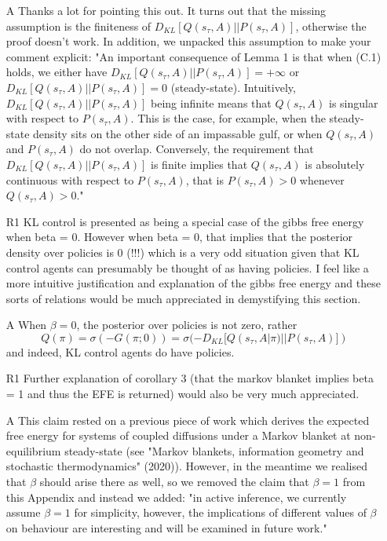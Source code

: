 \documentclass{article}
\begin{document}
\begin{itemize}
\item[A] Thanks a lot for pointing this out. It turns out that the missing assumption is the finiteness of $D_{KL}[Q(s_\tau, A) ||P(s_\tau, A)]$, otherwise the proof doesn't work. In addition, we unpacked this assumption to make your comment explicit: "An important consequence of Lemma 1 is that when (C.1) holds, we either have $D_{KL}[Q(s_\tau, A) ||P(s_\tau, A)]=+\infty$ or $D_{KL}[Q(s_\tau, A) ||P(s_\tau, A)]=0$ (steady-state). Intuitively, $D_{KL}[Q(s_\tau, A) ||P(s_\tau, A)]$ being infinite means that $Q(s_\tau, A)$ is singular with respect to $P(s_\tau, A)$. This is the case, for example, when the steady-state density sits on the other side of an impassable gulf, or when $Q(s_\tau, A)$ and $P(s_\tau, A)$ do not overlap. Conversely, the requirement that $D_{KL}[Q(s_\tau, A) ||P(s_\tau, A)]$ is finite implies that $Q(s_\tau, A)$ is absolutely continuous with respect to $P(s_\tau, A)$, that is $P(s_\tau, A)>0$ whenever $Q(s_\tau, A)>0$."
\item[R1] KL control is presented as being a special case of the gibbs free energy when beta = 0. However when beta = 0, that implies that the posterior density over policies is 0 (!!!) which is a very odd situation given that KL control agents can presumably be thought of as having policies. I feel like a more intuitive justification and explanation of the gibbs free energy and these sorts of relations would be much appreciated in demystifying this section.
\item[A] When $\beta =0$, the posterior over policies is not zero, rather
$$Q(\pi) = \sigma(-G(\pi; 0)) = \sigma(-D_{KL}[Q(s_\tau, A|\pi)||P(s_\tau, A)])$$
and indeed, KL control agents do have policies.
\item[R1] Further explanation of corollary 3 (that the markov blanket implies beta = 1 and thus the EFE is returned) would also be very much appreciated.
\item[A] This claim rested on a previous piece of work which derives the expected free energy for systems of coupled diffusions under a Markov blanket at non-equilibrium steady-state (see "Markov blankets, information geometry and stochastic thermodynamics" (2020)). However, in the meantime we realised that $\beta$ should arise there as well, so we removed the claim that $\beta =1$ from this Appendix and instead we added: "in active inference, we currently assume $\beta =1$ for simplicity, however, the implications of different values of $\beta$ on behaviour are interesting and will be examined in future work."
\end{itemize}
\end{document}
